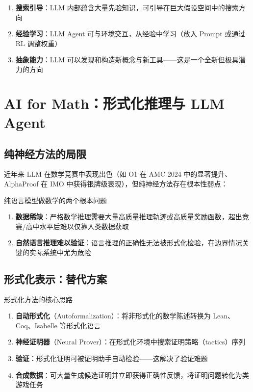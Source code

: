 \documentclass[a4paper]{article}
\begin{document}
\begin{enumerate}
    \item \textbf{搜索引导}：LLM 内部蕴含大量先验知识，可引导在巨大假设空间中的搜索方向
    \item \textbf{经验学习}：LLM Agent 可与环境交互，从经验中学习（放入 Prompt 或通过 RL 调整权重）
    \item \textbf{抽象能力}：LLM 可以发现和构造新概念与新工具——这是一个全新但极具潜力的方向
\end{enumerate}

\section{AI for Math：形式化推理与 LLM Agent}

\subsection{纯神经方法的局限}

近年来 LLM 在数学竞赛中表现出色（如 O1 在 AMC 2024 中的显著提升、AlphaProof 在 IMO 中获得银牌级表现），但纯神经方法存在根本性弱点：

\begin{warningbox}{纯语言模型做数学的两个根本问题}
\begin{enumerate}
    \item \textbf{数据稀缺}：严格数学推理需要大量高质量推理轨迹或高质量奖励函数，超出竞赛/高中水平后难以仅靠人类数据获取
    \item \textbf{自然语言推理难以验证}：语言推理的正确性无法被形式化检验，在边界情况关键的实际系统中尤为危险
\end{enumerate}
\end{warningbox}

\subsection{形式化表示：替代方案}

\begin{importantbox}{形式化方法的核心思路}
\begin{enumerate}
    \item \textbf{自动形式化}（Autoformalization）：将非形式化的数学陈述转换为 Lean、Coq、Isabelle 等形式化语言
    \item \textbf{神经证明器}（Neural Prover）：在形式化环境中搜索证明策略（tactics）序列
    \item \textbf{验证}：形式化证明可被证明助手自动检验——这解决了验证难题
    \item \textbf{合成数据}：可大量生成候选证明并立即获得正确性反馈，将证明问题转化为类游戏任务
\end{enumerate}
\end{importantbox}
\end{document}
